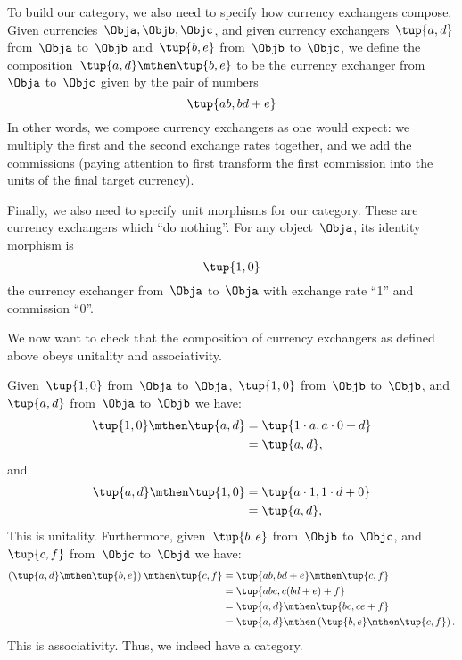 To build our category, we also need to specify how currency exchangers compose.
Given currencies~$\Obja, \Objb, \Objc$, and given currency exchangers~$\tup{a,d}$ from~$\Obja$ to~$\Objb$ and~$\tup{b,e}$ from~$\Objb$ to~$\Objc$,
we define the composition~$\tup{a,d} \mthen \tup{b,e}$ to be the currency exchanger from~$\Obja$ to~$\Objc$ given by the pair of numbers
\begin{equation}
    \label{eq:comp-law-curr}
    \tup{ab,bd+e}
\end{equation}
In other words, we compose currency exchangers as one would expect: we multiply the first and the second exchange rates together, and we add the commissions (paying attention to first transform the first commission into the units of the final target currency).

Finally, we also need to specify unit morphisms for our category.
These are currency exchangers which ``do nothing''.
For any object~$\Obja$, its identity morphism is
\begin{equation*}
    \tup{1,0}
\end{equation*}
the currency exchanger from~$\Obja$ to~$\Obja$ with exchange rate ``1'' and commission ``0''.

We now want to check that the composition of currency exchangers as defined above obeys unitality and associativity.

Given~$\tup{1,0}$ from~$\Obja$ to~$\Obja$,~$\tup{1,0}$ from~$\Objb$ to~$\Objb$, and~$\tup{a,d}$ from~$\Obja$ to~$\Objb$ we have:
\begin{equation*}
    \begin{aligned}
        \tup{1,0}\mthen\tup{a,d} & =\tup{1\cdot a, a\cdot 0+d} \\
                                 & =\tup{a,d},
    \end{aligned}
\end{equation*}
and
\begin{equation*}
    \begin{aligned}
        \tup{a,d}\mthen \tup{1,0} & =\tup{a\cdot 1, 1\cdot d+0} \\
                                  & =\tup{a,d},
    \end{aligned}
\end{equation*}
This is unitality.
Furthermore, given~$\tup{b,e}$ from~$\Objb$ to~$\Objc$, and~$\tup{c,f}$ from~$\Objc$ to~$\Objd$ we have:
\begin{equation*}
    \begin{aligned}
        \left( \tup{a,d}\mthen \tup{b,e}\right)\mthen \tup{c,f} & =\tup{ab,bd+e}\mthen \tup{c,f} \\
                                                                & =\tup{abc,c(bd+e)+f} \\
                                                                & =\tup{a,d}\mthen \tup{bc,ce+f} \\
                                                                & =\tup{a,d}\mthen \left( \tup{b,e}\mthen \tup{c,f}\right).
    \end{aligned}
\end{equation*}
This is associativity.
Thus, we indeed have a category.

